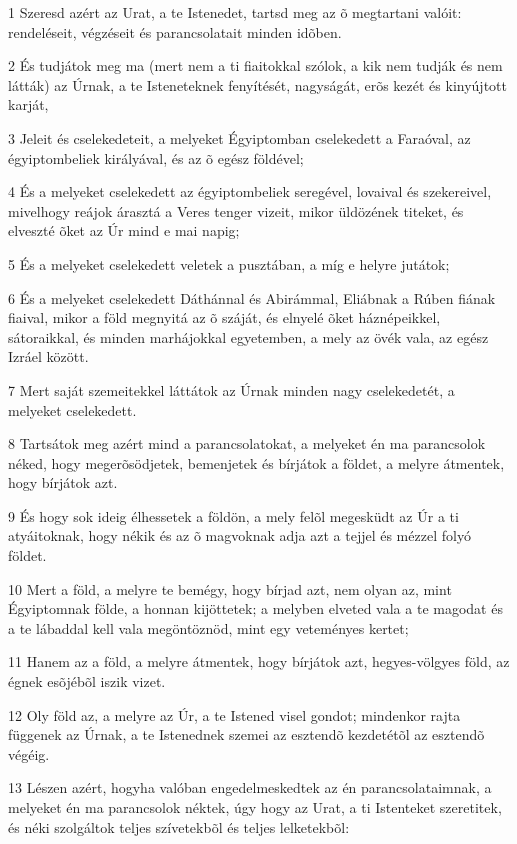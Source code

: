 \par 1 Szeresd azért az Urat, a te Istenedet, tartsd meg az õ megtartani valóit: rendeléseit, végzéseit és parancsolatait minden idõben.
\par 2 És tudjátok meg ma (mert nem a ti fiaitokkal szólok, a kik nem tudják és nem látták) az Úrnak, a te Isteneteknek fenyítését, nagyságát, erõs kezét és kinyújtott karját,
\par 3 Jeleit és cselekedeteit, a melyeket Égyiptomban cselekedett a Faraóval, az égyiptombeliek királyával, és az õ egész földével;
\par 4 És a melyeket cselekedett az égyiptombeliek seregével, lovaival és szekereivel, mivelhogy reájok árasztá a Veres tenger vizeit, mikor üldözének titeket, és elveszté õket az Úr mind e mai napig;
\par 5 És a melyeket cselekedett veletek a pusztában, a míg e helyre jutátok;
\par 6 És a melyeket cselekedett Dáthánnal és Abirámmal, Eliábnak a Rúben fiának fiaival, mikor a föld megnyitá az õ száját, és elnyelé õket háznépeikkel, sátoraikkal, és minden marhájokkal egyetemben, a mely az övék vala, az egész Izráel között.
\par 7 Mert saját szemeitekkel láttátok az Úrnak minden nagy cselekedetét, a melyeket cselekedett.
\par 8 Tartsátok meg azért mind a parancsolatokat, a melyeket én ma parancsolok néked, hogy megerõsödjetek, bemenjetek és bírjátok a földet, a melyre átmentek, hogy bírjátok azt.
\par 9 És hogy sok ideig élhessetek a földön, a mely felõl megesküdt az Úr a ti atyáitoknak, hogy nékik és az õ magvoknak adja azt a tejjel és mézzel folyó földet.
\par 10 Mert a föld, a melyre te bemégy, hogy bírjad azt, nem olyan az, mint Égyiptomnak földe, a honnan kijöttetek; a melyben elveted vala a te magodat és a te lábaddal kell vala megöntöznöd, mint egy veteményes kertet;
\par 11 Hanem az a föld, a melyre átmentek, hogy bírjátok azt, hegyes-völgyes föld, az égnek esõjébõl iszik vizet.
\par 12 Oly föld az, a melyre az Úr, a te Istened visel gondot; mindenkor rajta függenek az Úrnak, a te Istenednek szemei az esztendõ kezdetétõl az esztendõ végéig.
\par 13 Lészen azért, hogyha valóban engedelmeskedtek az én parancsolataimnak, a melyeket én ma parancsolok néktek, úgy hogy az Urat, a ti Istenteket szeretitek, és néki szolgáltok teljes szívetekbõl és teljes lelketekbõl:
